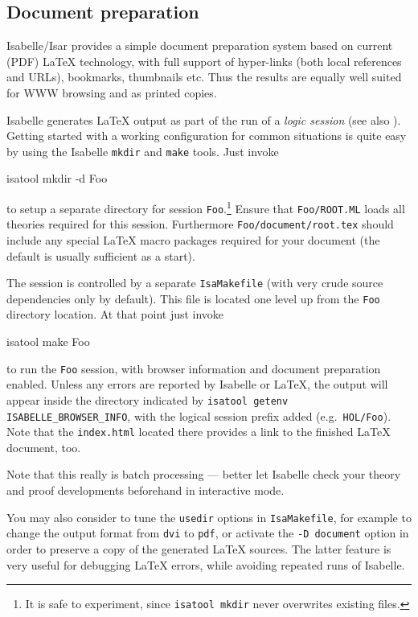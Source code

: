 \subsection{Document preparation}

Isabelle/Isar provides a simple document preparation system based on current
(PDF) {\LaTeX} technology, with full support of hyper-links (both local
references and URLs), bookmarks, thumbnails etc.  Thus the results are equally
well suited for WWW browsing and as printed copies.

\medskip

Isabelle generates {\LaTeX} output as part of the run of a \emph{logic
  session} (see also \cite{isabelle-sys}).  Getting started with a working
configuration for common situations is quite easy by using the Isabelle
\texttt{mkdir} and \texttt{make} tools.  Just invoke
\begin{ttbox}
  isatool mkdir -d Foo
\end{ttbox}
to setup a separate directory for session \texttt{Foo}.\footnote{It is safe to
  experiment, since \texttt{isatool mkdir} never overwrites existing files.}
Ensure that \texttt{Foo/ROOT.ML} loads all theories required for this session.
Furthermore \texttt{Foo/document/root.tex} should include any special {\LaTeX}
macro packages required for your document (the default is usually sufficient
as a start).

The session is controlled by a separate \texttt{IsaMakefile} (with very crude
source dependencies only by default).  This file is located one level up from
the \texttt{Foo} directory location.  At that point just invoke
\begin{ttbox}
  isatool make Foo
\end{ttbox}
to run the \texttt{Foo} session, with browser information and document
preparation enabled.  Unless any errors are reported by Isabelle or {\LaTeX},
the output will appear inside the directory indicated by \texttt{isatool
  getenv ISABELLE_BROWSER_INFO}, with the logical session prefix added (e.g.\ 
\texttt{HOL/Foo}).  Note that the \texttt{index.html} located there provides a
link to the finished {\LaTeX} document, too.

Note that this really is batch processing --- better let Isabelle check your
theory and proof developments beforehand in interactive mode.

\medskip

You may also consider to tune the \texttt{usedir} options in
\texttt{IsaMakefile}, for example to change the output format from
\texttt{dvi} to \texttt{pdf}, or activate the \texttt{-D document} option in
order to preserve a copy of the generated {\LaTeX} sources.  The latter
feature is very useful for debugging {\LaTeX} errors, while avoiding repeated
runs of Isabelle.

